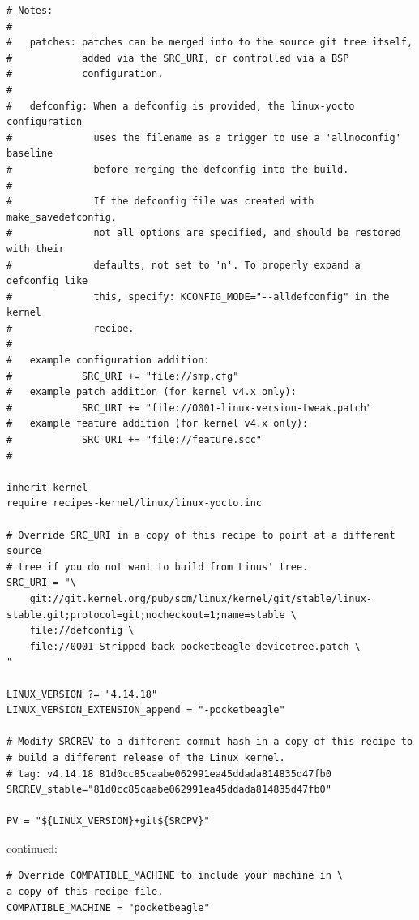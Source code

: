 \documentclass[a4paper,12pt,obeyspaces,spaces,hyphens]{article}
\begin{document}
\begin{tcolorbox}[enhanced jigsaw,colback=bg,boxrule=0pt,arc=0pt]
\begin{verbatim}
# Notes:
#
#   patches: patches can be merged into to the source git tree itself,
#            added via the SRC_URI, or controlled via a BSP
#            configuration.
#
#   defconfig: When a defconfig is provided, the linux-yocto configuration
#              uses the filename as a trigger to use a 'allnoconfig' baseline
#              before merging the defconfig into the build.
#
#              If the defconfig file was created with make_savedefconfig,
#              not all options are specified, and should be restored with their
#              defaults, not set to 'n'. To properly expand a defconfig like
#              this, specify: KCONFIG_MODE="--alldefconfig" in the kernel
#              recipe.
#
#   example configuration addition:
#            SRC_URI += "file://smp.cfg"
#   example patch addition (for kernel v4.x only):
#            SRC_URI += "file://0001-linux-version-tweak.patch"
#   example feature addition (for kernel v4.x only):
#            SRC_URI += "file://feature.scc"
#

inherit kernel
require recipes-kernel/linux/linux-yocto.inc

# Override SRC_URI in a copy of this recipe to point at a different source
# tree if you do not want to build from Linus' tree.
SRC_URI = "\
    git://git.kernel.org/pub/scm/linux/kernel/git/stable/linux-stable.git;protocol=git;nocheckout=1;name=stable \
    file://defconfig \
    file://0001-Stripped-back-pocketbeagle-devicetree.patch \
"

LINUX_VERSION ?= "4.14.18"
LINUX_VERSION_EXTENSION_append = "-pocketbeagle"

# Modify SRCREV to a different commit hash in a copy of this recipe to
# build a different release of the Linux kernel.
# tag: v4.14.18 81d0cc85caabe062991ea45ddada814835d47fb0
SRCREV_stable="81d0cc85caabe062991ea45ddada814835d47fb0"

PV = "${LINUX_VERSION}+git${SRCPV}"

\end{verbatim}
\end{tcolorbox}

continued:

\begin{tcolorbox}[enhanced jigsaw,colback=bg,boxrule=0pt,arc=0pt]
\begin{verbatim}
# Override COMPATIBLE_MACHINE to include your machine in \
a copy of this recipe file.
COMPATIBLE_MACHINE = "pocketbeagle"
\end{verbatim}
\end{tcolorbox}
\end{document}
